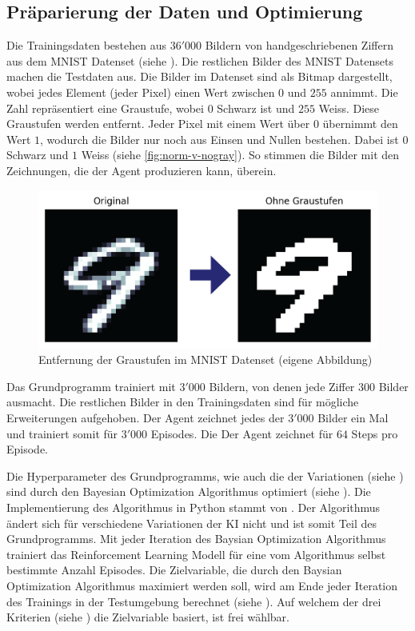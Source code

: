\subsection{Präparierung der Daten und Optimierung}\label{sub:m_grund_data}
Die Trainingsdaten bestehen aus $36'000$ Bildern von handgeschriebenen Ziffern
aus dem MNIST Datenset (siehe ). Die restlichen Bilder des
MNIST Datensets machen die Testdaten aus. Die Bilder im Datenset sind als Bitmap
dargestellt, wobei jedes Element (jeder Pixel) einen Wert zwischen $0$ und $255$
annimmt. Die Zahl repräsentiert eine Graustufe, wobei $0$ Schwarz ist und $255$
Weiss. Diese Graustufen werden entfernt. Jeder Pixel mit einem Wert über $0$
übernimmt den Wert $1$, wodurch die Bilder nur noch aus Einsen und Nullen
bestehen. Dabei ist $0$ Schwarz und $1$ Weiss (siehe \autoref{fig:norm-v-nogray}).
So stimmen die Bilder mit den Zeichnungen, die der Agent produzieren kann,
überein.
 
\begin{figure}[!ht]
 \centering
 \includegraphics[width=\textwidth]{images/methode/norm-v-nogray.png}
 \caption{Entfernung der Graustufen im MNIST Datenset (eigene Abbildung)}\label{fig:norm-v-nogray}
\end{figure}
 
 
Das Grundprogramm trainiert mit $3'000$ Bildern, von denen jede Ziffer $300$
Bilder ausmacht. Die restlichen Bilder in den Trainingsdaten sind für mögliche 
Erweiterungen aufgehoben. Der Agent zeichnet jedes der $3'000$ Bilder ein Mal und
trainiert somit für $3'000$ Episodes. Die Der Agent zeichnet für $64$ Steps pro
Episode.
 
Die Hyperparameter des Grundprogramms, wie auch die der Variationen (siehe
) sind durch den Bayesian Optimization Algorithmus
optimiert (siehe ). Die Implementierung des
Algorithmus in Python stammt von \cite{fernando_nogueira_bayesian_2014}. Der
Algorithmus ändert sich für verschiedene Variationen der KI nicht und ist somit
Teil des Grundprogramms. Mit jeder Iteration des Baysian Optimization
Algorithmus trainiert das Reinforcement Learning Modell für eine vom Algorithmus
selbst bestimmte Anzahl Episodes. Die Zielvariable, die durch den Baysian
Optimization Algorithmus maximiert werden soll, wird am Ende jeder Iteration des
Trainings in der Testumgebung berechnet (siehe ).
Auf welchem der drei Kriterien (siehe ) die Zielvariable
basiert, ist frei wählbar.
 
